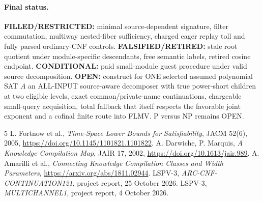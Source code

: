 \documentclass[11pt]{article}
\begin{document}
\paragraph{Final status.} \textbf{FILLED/RESTRICTED:}
minimal source-dependent signature, filter commutation,
multiway nested-fiber sufficiency, charged eager replay
toll and fully parsed ordinary-CNF controls.
\textbf{FALSIFIED/RETIRED:} stale root quotient under
module-specific descendants, free semantic labels,
retired cosine endpoint. \textbf{CONDITIONAL:} paid
small-module guest procedure under valid source
decomposition. \textbf{OPEN:} construct for ONE
selected assumed polynomial SAT $A$ an ALL-INPUT
source-aware decomposer with true power-short children
at two eligible levels, exact common/private-name
continuations, chargeable small-query acquisition,
total fallback that itself respects the favorable
joint exponent and a cofinal finite route into FLMV.
P versus NP remains OPEN.

\begin{thebibliography}{5}
 L. Fortnow et al.,
\emph{Time-Space Lower Bounds for Satisfiability},
JACM 52(6), 2005, \url{https://doi.org/10.1145/1101821.1101822}.
 A. Darwiche, P. Marquis,
\emph{A Knowledge Compilation Map}, JAIR 17, 2002,
\url{https://doi.org/10.1613/jair.989}.
 A. Amarilli et al.,
\emph{Connecting Knowledge Compilation Classes and Width Parameters},
\url{https://arxiv.org/abs/1811.02944}.
 LSPV-3,
\emph{ARC-CNF-CONTINUATION121}, project report,
25 October 2026.
 LSPV-3, \emph{MULTICHANNEL1},
project report, 4 October 2026.
\end{thebibliography}
\end{document}
